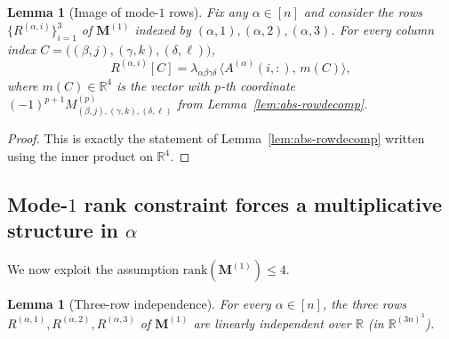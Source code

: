 \documentclass[12pt]{article}
\newtheorem{lemma}[theorem]{Lemma}
\theoremstyle{definition}
\begin{document}
\begin{lemma}[Image of mode-$1$ rows]\label{lem:row-image}
Fix any $\alpha\in[n]$ and consider the rows $\{R^{(\alpha,i)}\}_{i=1}^{3}$ of
$\mathbf{M}^{(1)}$ indexed by $(\alpha,1),(\alpha,2),(\alpha,3)$. For every column index
$C=\bigl((\beta,j),(\gamma,k),(\delta,\ell)\bigr)$,
\begin{equation}\label{eq:row-formula}
R^{(\alpha,i)}[C]=\lambda_{\alpha\beta\gamma\delta}\,\bigl\langle A^{(\alpha)}(i,:),\,m(C)\bigr\rangle,
\end{equation}
where $m(C)\in\mathbb{R}^4$ is the vector with $p$-th coordinate
$(-1)^{p+1}M^{(p)}_{(\beta,j),(\gamma,k),(\delta,\ell)}$ from
Lemma~\ref{lem:abs-rowdecomp}.
\end{lemma}

\begin{proof}
This is exactly the statement of Lemma~\ref{lem:abs-rowdecomp} written using the inner
product on $\mathbb{R}^4$.
\end{proof}

\subsection{Mode-$1$ rank constraint forces a multiplicative structure in $\alpha$}

We now exploit the assumption $\mathrm{rank}(\mathbf{M}^{(1)})\leq 4$.

\begin{lemma}[Three-row independence]\label{lem:three-rows}
For every $\alpha\in[n]$, the three rows
$R^{(\alpha,1)},R^{(\alpha,2)},R^{(\alpha,3)}$ of $\mathbf{M}^{(1)}$ are linearly independent
over $\mathbb{R}$ (in $\mathbb{R}^{(3n)^3}$).
\end{lemma}
\end{document}
